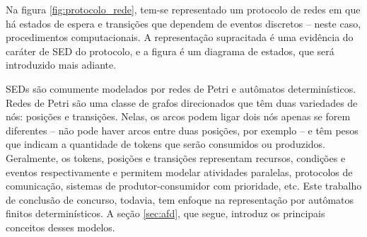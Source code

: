 
Na figura \ref{fig:protocolo_rede}, tem-se representado um protocolo de redes em que há estados de espera e transições que dependem de eventos discretos -- neste caso, procedimentos computacionais. A representação supracitada é uma evidência do caráter de SED do protocolo, e a figura é um diagrama de estados, que será introduzido mais adiante.

SEDs são comumente modelados por redes de Petri e autômatos determinísticos. Redes de Petri são uma classe de grafos direcionados que têm duas variedades de nós: posições e transições. Nelas, os arcos podem ligar dois nós apenas se forem diferentes -- não pode haver arcos entre duas posições, por exemplo -- e têm pesos que indicam a quantidade de tokens que serão consumidos ou produzidos. Geralmente, os tokens, posições e transições representam recursos, condições e eventos respectivamente e permitem modelar atividades paralelas, protocolos de comunicação, sistemas de produtor-consumidor com prioridade, etc. \cite{petrinets} Este trabalho de conclusão de concurso, todavia, tem enfoque na representação por autômatos finitos determinísticos. A seção \ref{sec:afd}, que segue, introduz os principais conceitos desses modelos.

